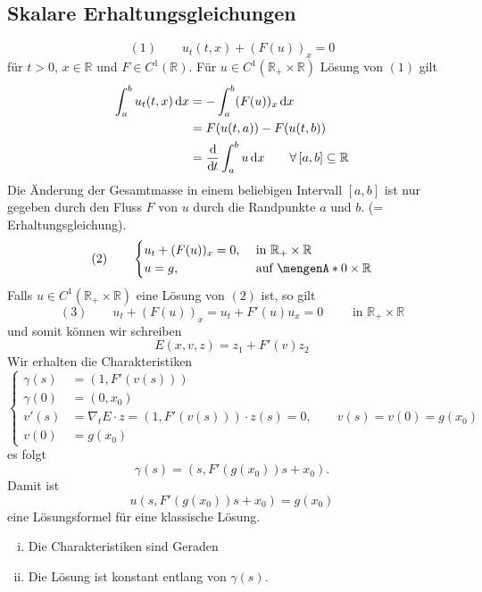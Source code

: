 \subsection{Skalare Erhaltungsgleichungen} 
\label{sub:skalare_erhaltungsgleichungen}
\[
	(1) \qquad u_t(t,x) + (F(u))_x = 0
\] für $t >0$, $x \in \mathbb{R}$ und $F \in C^1(\mathbb{R})$.
Für $u \in C^1(\mathbb{R}_+ \times \mathbb{R})$ Lösung von $(1)$ gilt 
\begin{align*}
	\int_{a}^{b} u_t(t,x) \,\mathrm{d}x &= - \int_{a}^{b} (F(u))_x \,\mathrm{d}x \\
	&= F(u(t,a))- F(u(t,b)) \\ &= \frac{\mathrm{d}\mkern-1.0mu }{\mathrm{d}\mkern-1.0mu t}  \int_{a}^{b} u  \,\mathrm{d}x \qquad \forall\, [a,b] \subseteq \mathbb{R}
\end{align*}
Die Änderung der Gesamtmasse in einem beliebigen Intervall $[a,b]$ ist nur gegeben durch den Fluss $F$ von $u$ durch die Randpunkte $a$ und $b$. (= Erhaltungsgleichung).
\[
	(2) \qquad \begin{cases}
		u_t + (F(u))_x = 0, &\text{ in }\mathbb{R}_+ \times \mathbb{R}\\
		u=g , &\text{ auf } \set{0} \times \mathbb{R}
	\end{cases}
\]
Falls $u \in C^1(\mathbb{R}_+ \times \mathbb{R})$ eine Lösung von $(2)$ ist, so gilt
\[
	(3) \qquad u_t + (F(u))_x = u_t +F'(u) u_x  = 0 \qquad \text{ in } \mathbb{R}_+ \times \mathbb{R}
\]
und somit können wir schreiben 
\[
	E(x,v,z) = z_1 + F'(v) z_2
\]
Wir erhalten die Charakteristiken
\[
	\begin{cases}
		\gamma(s) &= (1, F'(v(s)))\\
		\gamma(0) &= (0,x_0) \\
		v'(s) &=  \nabla _t E \cdot z = (1, F'(v(s))) \cdot z(s) = 0, \qquad v(s) = v(0) = g(x_0) \\
		v(0) &= g(x_0)
 	\end{cases}
\]
es folgt
\[
	\gamma(s) = (s, F'(g(x_0))s + x_0).
\]
Damit ist 
\[
	u(s,F'(g(x_0))s + x_0) = g(x_0) 
\]
eine Lösungsformel für eine klassische Lösung.
\begin{bemerkung}
	\begin{enumerate}[(i)]
		\item Die Charakteristiken sind Geraden
		\item Die Lösung ist konstant entlang von $\gamma(s)$.
	\end{enumerate}
\end{bemerkung}

